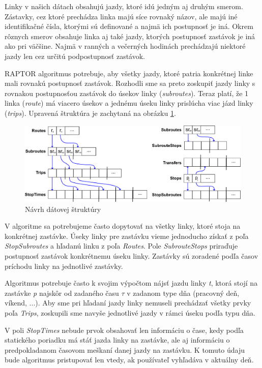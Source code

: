 Linky v našich dátach obsahujú jazdy, ktoré idú jedným aj druhým smerom. Zástavky, cez ktoré prechádza linka majú síce rovnaký názov, ale majú iné identifikačné čísla, ktorými sú definované a najmä ich postupnosť je iná. Okrem rôznych smerov obsahuje linka aj také jazdy, ktorých postupnosť zastávok je iná ako pri väčšine. Najmä v ranných a večerných hodinách prechádzajú niektoré jazdy len cez určitú podpostupnosť zastávok. 

RAPTOR algoritmus potrebuje, aby všetky jazdy, ktoré patria konkrétnej linke mali rovnakú postupnosť zastávok. Rozhodli sme sa preto zoskupiť jazdy linky s rovnakou postupnosťou zastávok do úsekov linky (\textit{subroutes}). Teraz platí, že 1 linka (\textit{route}) má viacero úsekov a jednému úseku linky prislúcha viac jázd linky (\textit{trips}). Upravená štruktúra je zachytaná na obrázku \ref{fig:my-datastructure}.

\begin{figure}[H]
\centerline{\includegraphics[width=1.0\textwidth]{images/my-structure}}
\caption[Návrh dátovej štruktúry]{Návrh dátovej štruktúry}
\label{fig:my-datastructure}
\end{figure}

V algoritme sa potrebujeme často dopytovať na všetky linky, ktoré stoja na konkrétnej zastávke. Úseky linky pre zastávku vieme jednoducho získať z poľa \textit{StopSubroutes} a hľadanú linku z poľa \textit{Routes}. Pole \textit{SubrouteStops} priraďuje postupnosť zastávok konkrétnemu úseku linky. Zastávky sú zoradené podľa časov príchodu linky na jednotlivé zastávky.

Algoritmus potrebuje často k svojim výpočtom nájsť jazdu linky \textit{t}, ktorá stojí na zastávke \textit{p} najskôr od zadaného času $\tau$ v zadanom type dňa (pracovný deň, víkend, ...). 
Aby sme pri hľadaní jazdy linky nemuseli prechádzať všetky prvky poľa \textit{Trips}, zoskupili sme navyše jednotlivé jazdy v rámci úseku podľa typu dňa.

V poli \textit{StopTimes} nebude prvok obsahovať len informáciu o čase, kedy podľa statického poriadku má stáť jazda linky na zastávke, ale aj informáciu o predpokladanom časovom meškaní danej jazdy na zastávku. K tomuto údaju bude algoritmus pristupovať len vtedy, ak používateľ vyhľadáva v aktuálny deň. 

